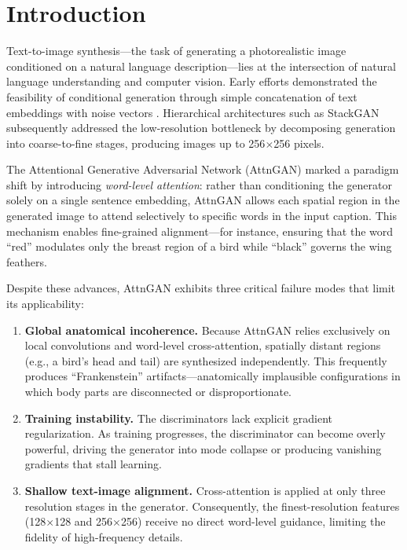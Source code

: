 \documentclass[conference]{IEEEtran}
\begin{document}
\section{Introduction}
\label{sec:intro}

Text-to-image synthesis---the task of generating a photorealistic image conditioned on a natural language description---lies at the intersection of natural language understanding and computer vision. Early efforts demonstrated the feasibility of conditional generation through simple concatenation of text embeddings with noise vectors \cite{reed2016generative, mirza2014conditional}. Hierarchical architectures such as StackGAN \cite{zhang2017stackgan} subsequently addressed the low-resolution bottleneck by decomposing generation into coarse-to-fine stages, producing images up to 256$\times$256 pixels.

The Attentional Generative Adversarial Network (AttnGAN) \cite{xu2018attngan} marked a paradigm shift by introducing \emph{word-level attention}: rather than conditioning the generator solely on a single sentence embedding, AttnGAN allows each spatial region in the generated image to attend selectively to specific words in the input caption. This mechanism enables fine-grained alignment---for instance, ensuring that the word ``red'' modulates only the breast region of a bird while ``black'' governs the wing feathers.

Despite these advances, AttnGAN exhibits three critical failure modes that limit its applicability:

\begin{enumerate}
    \item \textbf{Global anatomical incoherence.} Because AttnGAN relies exclusively on local convolutions and word-level cross-attention, spatially distant regions (e.g., a bird's head and tail) are synthesized independently. This frequently produces ``Frankenstein'' artifacts---anatomically implausible configurations in which body parts are disconnected or disproportionate.
    \item \textbf{Training instability.} The discriminators lack explicit gradient regularization. As training progresses, the discriminator can become overly powerful, driving the generator into mode collapse or producing vanishing gradients that stall learning.
    \item \textbf{Shallow text-image alignment.} Cross-attention is applied at only three resolution stages in the generator. Consequently, the finest-resolution features (128$\times$128 and 256$\times$256) receive no direct word-level guidance, limiting the fidelity of high-frequency details.
\end{enumerate}
\end{document}
